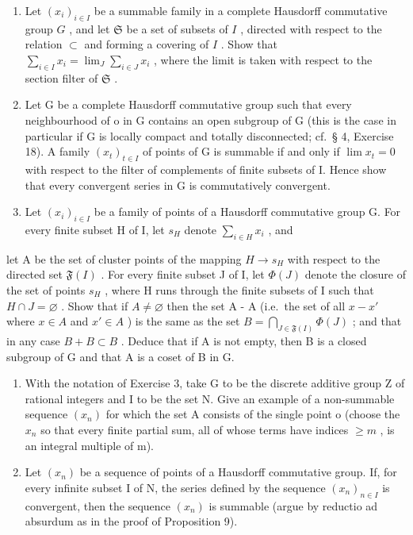 \BourbakiExerciseGroup

\begin{enumerate}
\def\labelenumi{\arabic{enumi})}
\item
  Let \((x_{i})_{i\in I}\) be a summable family in a complete Hausdorff commutative group \(G\) , and let \(\mathfrak{S}\) be a set of subsets of \(I\) , directed with respect to the relation \(\subset\) and forming a covering of \(I\) . Show that \(\sum_{i\in I}x_{i} = \lim_{J}\sum_{i\in J}x_{i}\) , where the limit is taken with respect to the section filter of \(\mathfrak{S}\) .
\item
  Let G be a complete Hausdorff commutative group such that every neighbourhood of o in G contains an open subgroup of G (this is the case in particular if G is locally compact and totally disconnected; cf.~§ 4, Exercise 18). A family \((x_{t})_{t\in I}\) of points of G is summable if and only if \(\lim x_t = 0\) with respect to the filter of complements of finite subsets of I. Hence show that every convergent series in G is commutatively convergent.
\item
  Let \((x_{i})_{i\in I}\) be a family of points of a Hausdorff commutative group G. For every finite subset H of I, let \(s_{H}\) denote \(\sum_{i\in H}x_{i}\) , and
\end{enumerate}

let A be the set of cluster points of the mapping \(H \rightarrow s_{H}\) with respect to the directed set \(\mathfrak{F}(I)\) . For every finite subset J of I, let \(\Phi(J)\) denote the closure of the set of points \(s_{H}\) , where H runs through the finite subsets of I such that \(H \cap J = \varnothing\) . Show that if \(A \neq \varnothing\) then the set A - A (i.e.~the set of all \(x - x'\) where \(x \in A\) and \(x' \in A\) ) is the same as the set \(B = \bigcap_{J \in \mathfrak{F}(I)} \Phi(J)\) ; and that in any case \(B + B \subset B\) . Deduce that if A is not empty, then B is a closed subgroup of G and that A is a coset of B in G.

\begin{enumerate}
\def\labelenumi{\arabic{enumi})}
\setcounter{enumi}{3}
\item
  With the notation of Exercise 3, take G to be the discrete additive group Z of rational integers and I to be the set N. Give an example of a non-summable sequence \((x_{n})\) for which the set A consists of the single point o (choose the \(x_{n}\) so that every finite partial sum, all of whose terms have indices \(\geqslant m\) , is an integral multiple of m).
\item
  Let \((x_{n})\) be a sequence of points of a Hausdorff commutative group. If, for every infinite subset I of N, the series defined by the sequence \((x_{n})_{n\in I}\) is convergent, then the sequence \((x_{n})\) is summable (argue by reductio ad absurdum as in the proof of Proposition 9).
\end{enumerate}


